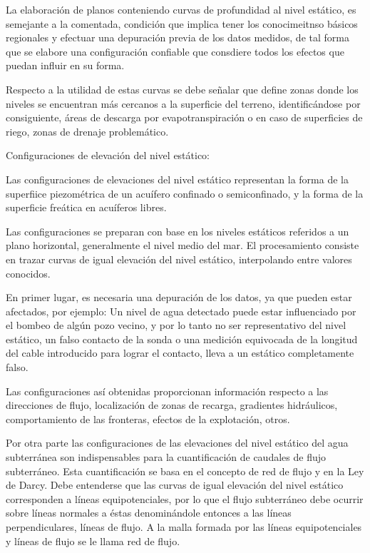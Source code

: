 La elaboración de planos conteniendo curvas de profundidad al nivel estático, es semejante a la comentada, condición que implica tener los conocimeitnso básicos regionales y efectuar una depuración previa de los datos medidos, de tal forma que se elabore una configuración confiable que consdiere todos los efectos que puedan influir en su forma.

Respecto a la utilidad de estas curvas se debe señalar que define zonas donde los niveles se encuentran más cercanos a la superficie del terreno, identificándose por consiguiente, áreas de descarga por evapotranspiración o en caso de superficies de riego, zonas de drenaje problemático.

Configuraciones de elevación del nivel estático:

Las configuraciones de elevaciones del nivel estático representan la forma de la superfiice piezométrica de un acuífero confinado o semiconfinado, y la forma de la superficie freática en acuíferos libres.

Las configuraciones se preparan con base en los niveles estáticos referidos a un plano horizontal, generalmente el nivel medio del mar. El procesamiento consiste en trazar curvas de igual elevación del nivel estático, interpolando entre valores conocidos.

En primer lugar, es necesaria una depuración de los datos, ya que pueden estar afectados, por ejemplo: Un nivel de agua detectado puede estar influenciado por el bombeo de algún pozo vecino, y por lo tanto no ser representativo del nivel estático, un falso contacto de la sonda o una medición equivocada de la longitud del cable introducido para lograr el contacto, lleva a un estático completamente falso.

Las configuraciones así obtenidas proporcionan información respecto a las direcciones de flujo, localización de zonas de recarga, gradientes hidráulicos, comportamiento de las fronteras, efectos de la explotación, otros.

Por otra parte las configuraciones de las elevaciones del nivel estático del agua subterránea son indispensables para la cuantificación de caudales de flujo subterráneo. Esta cuantificación se basa en el concepto de red de flujo y en la Ley de Darcy. Debe entenderse que las curvas de igual elevación del nivel estático corresponden a líneas equipotenciales, por lo que el flujo subterráneo debe ocurrir sobre líneas normales a éstas denominándole entonces a las líneas perpendiculares, líneas de flujo. A la malla formada por las líneas equipotenciales y líneas de flujo se le llama red de flujo.

